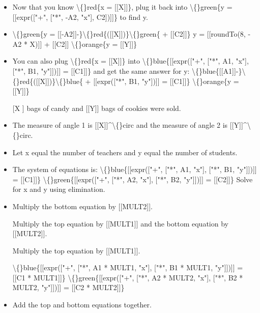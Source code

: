 \documentclass{article}
\begin{document}
\begin{itemize}
                        
                            [[expr(["*", roundTo(8, A1 + B1 * -A2), "x"])]] = [[roundTo(8, C1 - B1 * C2)]]
                        
                        
                            x = $\frac{[[roundTo( 8, C1 - B1 * C2 )]]}{[[roundTo(8, A1 + B1 * -A2)]]}$
                        
                        \textbackslash\{\}red\{x = [[X]]\}
  \item Now that you know \textbackslash\{\}red\{x = [[X]]\}, plug it back into  \textbackslash\{\}green\{y = [[expr(["+", ["*", -A2, "x"], C2])]]\} to find y.
  \item \textbackslash\{\}green\{y = [[-A2]]-\}\textbackslash\{\}red\{([[X]])\}\textbackslash\{\}green\{ + [[C2]]\}
                        y = [[roundTo(8, -A2 * X)]] + [[C2]]
                        \textbackslash\{\}orange\{y = [[Y]]\}
  \item You can also plug \textbackslash\{\}red\{x = [[X]]\} into  \textbackslash\{\}blue\{[[expr(["+", ["*", A1, "x"], ["*", B1, "y"]])]] = [[C1]]\} and get the same answer for y:
                        \textbackslash\{\}blue\{[[A1]]-\}\textbackslash\{\}red\{([[X]])\}\textbackslash\{\}blue\{ + [[expr(["*", B1, "y"])]] = [[C1]]\}
                        \textbackslash\{\}orange\{y = [[Y]]\}
  \item [[X]] bags of candy and [[Y]] bags of cookies were sold.
  \item The measure of angle 1 is [[X]]\textasciicircum{}\textbackslash\{\}circ and the measure of angle 2 is [[Y]]\textasciicircum{}\textbackslash\{\}circ.
  \item Let x equal the number of teachers and y equal the number of students.
  \item The system of equations is:
                        \textbackslash\{\}blue\{[[expr(["+", ["*", A1, "x"], ["*", B1, "y"]])]] = [[C1]]\}
                        \textbackslash\{\}green\{[[expr(["+", ["*", A2, "x"], ["*", B2, "y"]])]] = [[C2]]\}
                        Solve for x and y using elimination.
  \item Multiply the bottom equation by [[MULT2]].
                        
                            Multiply the top equation by [[MULT1]] and the bottom equation by [[MULT2]].
                        
                            Multiply the top equation by [[MULT1]].
                        
                        \textbackslash\{\}blue\{[[expr(["+", ["*", A1 * MULT1, "x"], ["*", B1 * MULT1, "y"]])]] = [[C1 * MULT1]]\}
                        \textbackslash\{\}green\{[[expr(["+", ["*", A2 * MULT2, "x"], ["*", B2 * MULT2, "y"]])]] = [[C2 * MULT2]]\}
  \item Add the top and bottom equations together.
                        

\end{itemize}
\end{document}
